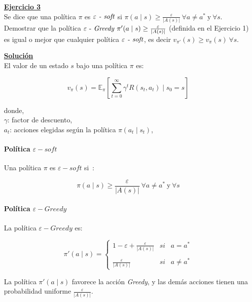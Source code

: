 \indent\underline{\textbf{Ejercicio 3}}\\
Se dice que una política $\pi$ es $\varepsilon \text{\textit{ - soft}}$ si $\pi(a \mid s) \geq \frac{\varepsilon}{|A(s)|} \ \forall a \neq a^{\ast} \ \text{y} \ \forall s$.
Demostrar que la política $\varepsilon \text{ - \textit{Greedy}} \ \pi'(a \mid s) \geq \frac{\varepsilon}{|A(s)|}$ (definida en el Ejercicio 1) es igual o mejor que cualquier política $\varepsilon \text{\textit{ - soft}}$, es decir $v_{\pi'}(s)\geq v_{\pi}(s) \ \forall s$.

\indent\underline{\textbf{Solución}}\\

El valor de un estado $s$ bajo una política $\pi$ es:

\[
    v_{\pi}(s) = \mathbb{E}_{\pi} \left[\sum_{t=0}^{\infty} \gamma^t R(s_t, a_t) \mid s_0 = s\right]
\]

donde,\\
$\gamma$: factor de descuento,\\
$a_t$: acciones elegidas según la política $\pi(a_t \mid s_t)$,

\paragraph{Política $\varepsilon -\textit{soft}$}
Una política $\pi$ es $\varepsilon -\textit{soft}$ si~\cite{Sutton2018}:

\[
    \pi(a \mid s) \geq \frac{\varepsilon}{|A(s)|} \ \forall a \neq a^{\ast} \ \text{y} \ \forall s
\]

\paragraph{Política $\varepsilon -\textit{Greedy}$}
La política $\varepsilon -\textit{Greedy}$ es:

\begin{equation}
    \pi'(a \mid s) = \left\{
    \begin{array}{lcc}
        1 - \varepsilon + \frac{\varepsilon}{|A(s)|} & si & a = a^{\ast}    \\ \\
        \frac{\varepsilon}{|A(s)|} & si & a \neq a^{\ast}
    \end{array}
    \right.
    \label{eq:equation3}
\end{equation}

La política $\pi'(a \mid s)$ favorece la acción \textit{Greedy}, y las demás acciones tienen una probabilidad uniforme $\frac{\varepsilon}{|A(s)|}$.

